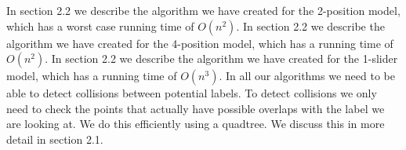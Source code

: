 \documentclass[crop=false,a4paper,oneside,11pt]{standalone}
\begin{document}
In section 2.2 we describe the algorithm we have created for the 2-position model, which has a worst case running time of $O(n^2)$. In section 2.2 we describe the algorithm we have created for the 4-position model, which has a running time of $O(n^2)$. In section 2.2 we describe the algorithm we have created for the 1-slider model, which has a running time of $O(n^3)$. In all our algorithms we need to be able to detect collisions between potential labels. To detect collisions we only need to check the points that actually have possible overlaps with the label we are looking at. We do this efficiently using a quadtree. We discuss this in more detail in section 2.1.
\end{document}
